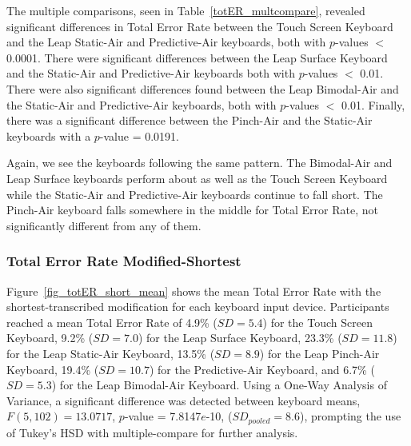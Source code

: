 The multiple comparisons, seen in Table~\ref{totER_multcompare}, revealed significant differences in Total Error Rate between the Touch Screen Keyboard and the Leap Static-Air and Predictive-Air keyboards, both with $p$-values $<$ 0.0001. There were significant differences between the Leap Surface Keyboard and the Static-Air and Predictive-Air keyboards both with $p$-values $<$ 0.01. There were also significant differences found between the Leap Bimodal-Air and the Static-Air and Predictive-Air keyboards, both with $p$-values $<$ 0.01. Finally, there was a significant difference between the Pinch-Air and the Static-Air keyboards with a $p$-value = 0.0191.

Again, we see the keyboards following the same pattern. The Bimodal-Air and Leap Surface keyboards perform about as well as the Touch Screen Keyboard while the Static-Air and Predictive-Air keyboards continue to fall short. The Pinch-Air keyboard falls somewhere in the middle for Total Error Rate, not significantly different from any of them.

\subsubsection{Total Error Rate Modified-Shortest}
Figure~\ref{fig_totER_short_mean} shows the mean Total Error Rate with the shortest-transcribed modification for each keyboard input device. Participants reached a mean Total Error Rate of 4.9\% ($SD = 5.4$) for the Touch Screen Keyboard, 9.2\% ($SD = 7.0$) for the Leap Surface Keyboard, 23.3\% ($SD = 11.8$) for the Leap Static-Air Keyboard, 13.5\% ($SD = 8.9$) for the Leap Pinch-Air Keyboard, 19.4\% ($SD = 10.7$) for the Predictive-Air Keyboard, and 6.7\% ($SD = 5.3$) for the Leap Bimodal-Air Keyboard. Using a One-Way Analysis of Variance, a significant difference was detected between keyboard means, $F(5, 102) = 13.0717$, $p$-value = 7.8147$e$-10, ($SD_{pooled} = 8.6$), prompting the use of Tukey's HSD with multiple-compare for further analysis.

